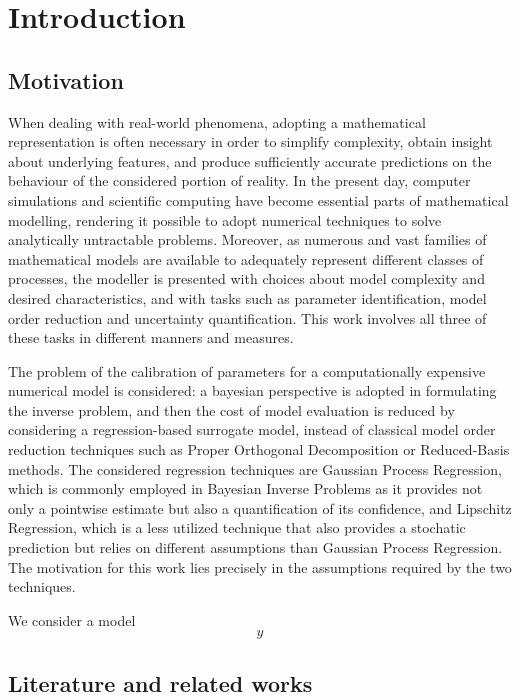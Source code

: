 \section{Introduction} \label{sec:intro}


\subsection{Motivation}\label{sec:motivation}

When dealing with real-world phenomena, adopting a mathematical representation is often necessary in order to simplify complexity, obtain insight about underlying features, and produce sufficiently accurate predictions on the behaviour of the considered portion of reality. 
In the present day, computer simulations and scientific computing have become essential parts of mathematical modelling, rendering it possible to adopt numerical techniques to solve analytically untractable problems.
Moreover, as numerous and vast families of mathematical models are available to adequately represent different classes of processes, the modeller is presented with choices about model complexity and desired characteristics, and with tasks such as parameter identification, model order reduction and uncertainty quantification. 
This work involves all three of these tasks in different manners and measures. 

The problem of the calibration of parameters for a computationally expensive numerical model is considered: a bayesian perspective is adopted in formulating the inverse problem, and then the cost of model evaluation is reduced by considering a regression-based surrogate model, instead of classical model order reduction techniques such as Proper Orthogonal Decomposition or Reduced-Basis methods.
The considered regression techniques are Gaussian Process Regression, which is commonly employed in Bayesian Inverse Problems as it provides not only a pointwise estimate but also a quantification of its confidence, and Lipschitz Regression, which is a less utilized technique that also provides a stochatic prediction but relies on different assumptions than Gaussian Process Regression. 
The motivation for this work lies precisely in the assumptions required by the two techniques.

We consider a model 
\[
 y
\]



\subsection{Literature and related works}\label{sec:literature}
